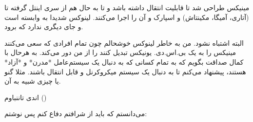 \begin{emailbox}
مینیکس طراحی شد تا قابلیت انتقال داشته باشد و تا به حال هم از سری
اینتل گرفته تا  (آتاری،‌ آمیگا، مکینتاش) و اسپارک و
 آن را اجرا می‌کنند. لینوکس شدیدا به  وابسته
است و جای دیگری ندارد که برود.

البته اشتباه نشود. من به خاطر لینوکس خوشحالم چون تمام افرادی که سعی
می‌کنند مینیکس را به یک بی.اس.دی. یونیکس تبدیل کنند را از من دور
می‌کند. به هرحال با کمال صداقت بگویم که به تمام کسانی که به دنبال یک
سیستم‌عامل *مدرن* و *آزاد* هستند، پیشنهاد می‌کنم تا به دنبال یک سیستم
میکروکرنل و قابل انتقال باشند. مثلا گنو یا چیزی شبیه به آن.

\hfill اندی تاننباوم ()
\end{emailbox}

می‌دانستم که باید از شرافتم دفاع کنم پس نوشتم:

